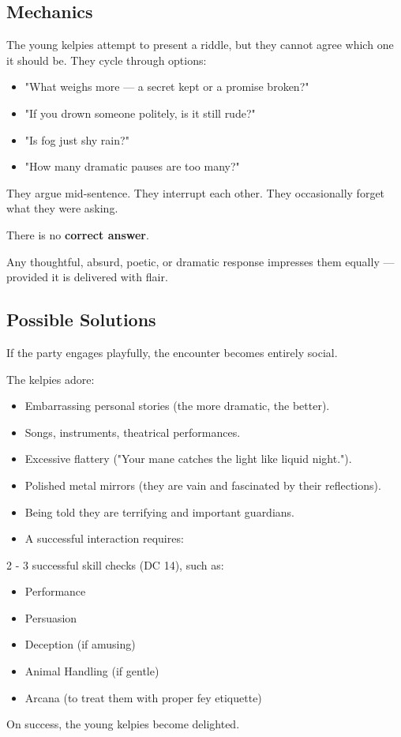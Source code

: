 \subsection*{Mechanics}
{\entryfont The young kelpies attempt to present a riddle, but they cannot agree which one it should be. They cycle through options:
\begin{itemize}
	\item "What weighs more — a secret kept or a promise broken?"
	\item "If you drown someone politely, is it still rude?"
	\item "Is fog just shy rain?"
	\item "How many dramatic pauses are too many?"
\end{itemize}
They argue mid-sentence. They interrupt each other. They occasionally forget what they were asking.

There is no \textbf{correct answer}.

Any thoughtful, absurd, poetic, or dramatic response impresses them equally — provided it is delivered with flair.}

\subsection*{Possible Solutions}
{\entryfont If the party engages playfully, the encounter becomes entirely social.

The kelpies adore:
\begin{itemize}
	\item Embarrassing personal stories (the more dramatic, the better).
	\item Songs, instruments, theatrical performances.
	\item Excessive flattery ("Your mane catches the light like liquid night.").
	\item Polished metal mirrors (they are vain and fascinated by their reflections).
	\item Being told they are terrifying and important guardians.
	\item A successful interaction requires:
\end{itemize}
2 - 3 successful skill checks (DC 14), such as:
\begin{itemize}
	\item Performance
	\item Persuasion
	\item Deception (if amusing)
	\item Animal Handling (if gentle)
	\item Arcana (to treat them with proper fey etiquette)
\end{itemize}
On success, the young kelpies become delighted.}

